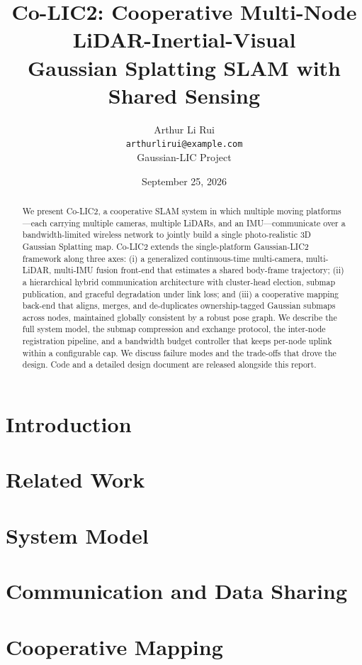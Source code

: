 \documentclass[10pt,letterpaper]{article}
\title{Co-LIC2: Cooperative Multi-Node LiDAR-Inertial-Visual \\
       Gaussian Splatting SLAM with Shared Sensing}
\author{Arthur Li Rui \\
  \texttt{arthurlirui@example.com} \\
  Gaussian-LIC Project
}
\date{September 25, 2026}
\begin{document}
\maketitle

\begin{abstract}
We present Co-LIC2, a cooperative SLAM system in which multiple moving
platforms---each carrying multiple cameras, multiple LiDARs, and an
IMU---communicate over a bandwidth-limited wireless network to jointly build a
single photo-realistic 3D Gaussian Splatting map. Co-LIC2 extends the
single-platform Gaussian-LIC2 framework along three axes: (i) a generalized
continuous-time multi-camera, multi-LiDAR, multi-IMU fusion front-end that
estimates a shared body-frame trajectory; (ii) a hierarchical hybrid
communication architecture with cluster-head election, submap publication, and
graceful degradation under link loss; and (iii) a cooperative mapping back-end
that aligns, merges, and de-duplicates ownership-tagged Gaussian submaps across
nodes, maintained globally consistent by a robust pose graph. We describe the
full system model, the submap compression and exchange protocol, the
inter-node registration pipeline, and a bandwidth budget controller that keeps
per-node uplink within a configurable cap. We discuss failure modes and the
trade-offs that drove the design. Code and a detailed design document are
released alongside this report.
\end{abstract}

\section{Introduction}


\section{Related Work}


\section{System Model}


\section{Communication and Data Sharing}


\section{Cooperative Mapping}

\end{document}
